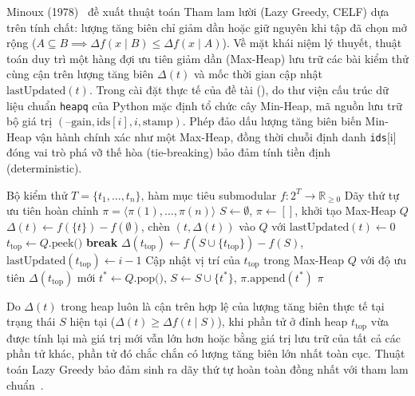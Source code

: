 Minoux (1978)~\cite{minoux1978accelerated} đề xuất thuật toán Tham lam lười (Lazy Greedy, CELF) dựa trên tính chất: lượng tăng biên chỉ giảm dần hoặc giữ nguyên khi tập đã chọn mở rộng ($A \subseteq B \implies \Delta f(x \mid B) \le \Delta f(x \mid A)$). Về mặt khái niệm lý thuyết, thuật toán duy trì một hàng đợi ưu tiên giảm dần (Max-Heap) lưu trữ các bài kiểm thử cùng cận trên lượng tăng biên $\Delta(t)$ và mốc thời gian cập nhật $\text{lastUpdated}(t)$. Trong cài đặt thực tế của đề tài (), do thư viện cấu trúc dữ liệu chuẩn \texttt{heapq} của Python mặc định tổ chức cây Min-Heap, mã nguồn lưu trữ bộ giá trị $(\text{--}\text{gain}, \text{ids}[i], i, \text{stamp})$. Phép đảo dấu lượng tăng biên biến Min-Heap vận hành chính xác như một Max-Heap, đồng thời chuỗi định danh \texttt{ids}[i] đóng vai trò phá vỡ thế hòa (tie-breaking) bảo đảm tính tiền định (deterministic).

\begin{algorithm}[H]
\caption{Thuật toán Lazy Greedy cho bài toán lập lịch TCP}
\label{algo:lazy_greedy}
\begin{algorithmic}[1]
\Require Bộ kiểm thử $T = \{t_1, \dots, t_n\}$, hàm mục tiêu submodular $f: 2^T \to \mathbb{R}_{\ge 0}$
\Ensure Dãy thứ tự ưu tiên hoàn chỉnh $\pi = \langle \pi(1), \dots, \pi(n) \rangle$
\State $S \gets \emptyset$, $\pi \gets []$, khởi tạo Max-Heap $Q$
    \State $\Delta(t) \gets f(\{t\}) - f(\emptyset)$, chèn $(t, \Delta(t))$ vào $Q$ với $\text{lastUpdated}(t) \gets 0$
\EndFor
{}
        \State $t_{\text{top}} \gets Q.\text{peek()}$
            \State \textbf{break} 
        \EndIf
        \State $\Delta(t_{\text{top}}) \gets f(S \cup \{t_{\text{top}}\}) - f(S)$, $\text{lastUpdated}(t_{\text{top}}) \gets i - 1$
        \State Cập nhật vị trí của $t_{\text{top}}$ trong Max-Heap $Q$ với độ ưu tiên $\Delta(t_{\text{top}})$ mới
    \EndWhile
    \State $t^* \gets Q.\text{pop()}$, $S \gets S \cup \{t^*\}$, $\pi.\text{append}(t^*)$
\EndFor
\State \Return $\pi$
\end{algorithmic}
\end{algorithm}

Do $\Delta(t)$ trong heap luôn là cận trên hợp lệ của lượng tăng biên thực tế tại trạng thái $S$ hiện tại ($\Delta(t) \ge \Delta f(t \mid S)$), khi phần tử ở đỉnh heap $t_{\text{top}}$ vừa được tính lại mà giá trị mới vẫn lớn hơn hoặc bằng giá trị lưu trữ của tất cả các phần tử khác, phần tử đó chắc chắn có lượng tăng biên lớn nhất toàn cục. Thuật toán Lazy Greedy bảo đảm sinh ra dãy thứ tự hoàn toàn đồng nhất với tham lam chuẩn~\cite{minoux1978accelerated}.

